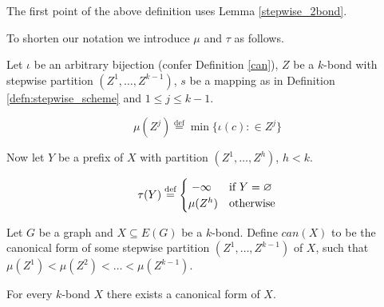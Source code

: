 \noindent
\begin{note}
The first point of the above definition uses Lemma \ref{stepwise_2bond}.
\end{note}

\clearpage %

\noindent
To shorten our notation we introduce $\mu$ and $\tau$ as follows.


\begin{defn}
	Let $\iota$ be an arbitrary bijection (confer Definition \ref{can}), $Z$ be a $k$-bond with stepwise partition $(Z^1,\ldots,Z^{k-1})$, $s$ be a mapping as in Definition \ref{defn:stepwise_scheme} and $1 \leq j \leq k - 1$.

\[
	\mu(Z^j) \stackrel{\text{def}}{=} \min\{ \iota(c) : \in Z^j \}
\]

\medskip

\noindent
Now let $Y$ be a prefix of $X$ with partition $(Z^1,\ldots, Z^h)$, $h < k$.

	\[
		\tau(Y) \stackrel{\text{def}}{=}
		\begin{cases}
			\hfill -\infty    		 \hfill & \text{if $Y = \varnothing$} \\
			\hfill \mu(Z^h) \hfill & \text{otherwise} \\
		\end{cases}
	\]

\end{defn}


\begin{defn}
	\label{defn:can_bond}

	Let $G$ be a graph and $X \subseteq E(G)$ be a $k$-bond. Define $can(X)$ to be the canonical form of some stepwise partition $(Z^1,\ldots,Z^{k-1})$ of $X$, such that $\mu(Z^1) < \mu(Z^2) < \ldots < \mu(Z^{k-1})$.
\end{defn}


\begin{lem}
	\label{lem:every_kbond_has_can}
	For every $k$-bond $X$ there exists a canonical form of $X$.
\end{lem}

